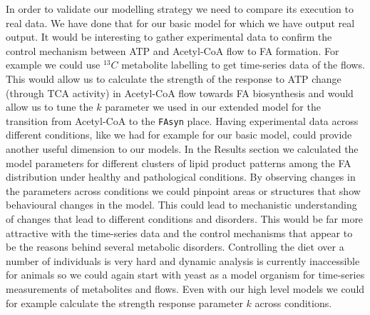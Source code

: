 In order to validate our modelling strategy we need to compare its execution to real data. We have done
that for our basic model for which we have output real output. It would be interesting to gather experimental data to confirm the
control mechanism between ATP and Acetyl-CoA flow to FA formation. For
example we could use $^{13}C$ metabolite labelling to get time-series
data of the flows. This would allow us to calculate the strength of
the response to ATP change (through TCA activity) in Acetyl-CoA flow towards FA biosynthesis
and would allow us to tune the $k$ parameter we used in our extended
model for the transition from Acetyl-CoA to the \texttt{FAsyn}
place. Having experimental data across different conditions, like we
had for example for our basic model, could provide another useful
dimension to our models. In the Results section we calculated the
model parameters for different clusters of lipid product patterns among the FA distribution under healthy and pathological conditions. By
observing changes in the parameters across conditions we could
pinpoint areas or structures that show behavioural changes in the model. This could lead
to mechanistic understanding of changes that lead to different
conditions and disorders. This would be far more attractive with the
time-series data and the control mechanisms that appear to be the
reasons behind several metabolic disorders. Controlling the diet over
a number of individuals is very hard and dynamic analysis is currently
inaccessible for animals so we could again start with yeast as a
model organism for time-series measurements of metabolites and
flows. Even with our high level
models we could for example calculate the strength response parameter
$k$ across conditions.


